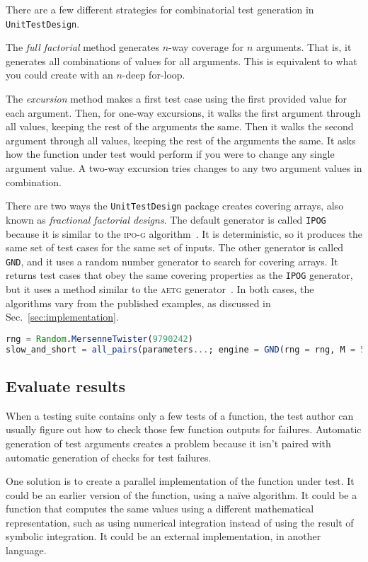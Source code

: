 \documentclass{juliacon}
\newcommand{\utd}{\texttt{UnitTestDesign}\xspace}
\begin{document}
There are a few different strategies for combinatorial test generation in \utd.

\vskip 6pt
The \emph{full factorial} method generates $n$-way coverage for $n$ arguments. That is, it generates all combinations of values for all arguments. This is equivalent to what you could create with an $n$-deep for-loop.

\vskip 6pt
The \emph{excursion} method makes a first test case using the first provided value for each argument. Then, for one-way excursions, it walks the first argument through all values, keeping the rest of the arguments the same. Then it walks the second argument through all values, keeping the rest of the arguments the same. It asks how the function under test would perform if you were to change any single argument value. A two-way excursion tries changes to any two argument values in combination.

\vskip 6pt
There are two ways the \utd package creates covering arrays, also known as \emph{fractional factorial designs}. The default generator is called \verb|IPOG| because it is similar to the \textsc{ipo-g} algorithm~\cite{Lei2008-xt}. It is deterministic, so it produces the same set of test cases for the same set of inputs. The other generator is called \verb|GND|, and it uses a random number generator to search for covering arrays. It returns test cases that obey the same covering properties as the \verb|IPOG| generator, but it uses a method similar to the \textsc{aetg} generator~\cite{Cohen1997-lb}. In both cases, the algorithms vary from the published examples, as discussed in Sec.~\ref{sec:implementation}.

\begin{lstlisting}[language=Julia]
rng = Random.MersenneTwister(9790242)
slow_and_short = all_pairs(parameters...; engine = GND(rng = rng, M = 50))
\end{lstlisting}

\subsection{Evaluate results}

When a testing suite contains only a few tests of a function, the test author can usually figure out how to check those few function outputs for failures. Automatic generation of test arguments creates a problem because it isn't paired with automatic generation of checks for test failures.

\vskip 6pt
One solution is to create a parallel implementation of the function under test. It could be an earlier version of the function, using a na{\"i}ve algorithm. It could be a function that computes the same values using a different mathematical representation, such as using numerical integration instead of using the result of symbolic integration. It could be an external implementation, in another language.
\end{document}
